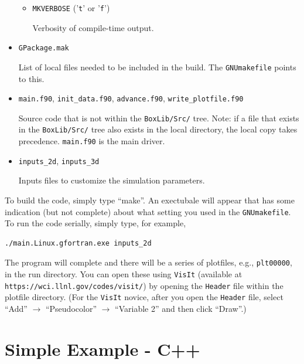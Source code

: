 \begin{itemize}
\begin{itemize}
    \item {\tt MKVERBOSE} ('{\tt t}' or '{\tt f}')

    Verbosity of compile-time output.

  \end{itemize}

\item {\tt GPackage.mak}

List of local files needed to be included in the build.  The {\tt GNUmakefile} points to this.

\item {\tt main.f90}, {\tt init\_data.f90}, {\tt advance.f90}, {\tt write\_plotfile.f90}

Source code that is not within the {\tt BoxLib/Src/} tree.  Note: if a file that exists in the
{\tt BoxLib/Src/} tree also exists in the local directory, the local copy takes precedence.
{\tt main.f90} is the main driver.

\item {\tt inputs\_2d}, {\tt inputs\_3d}

Inputs files to customize the simulation parameters.

\end{itemize}

To build the code, simply type ``make''.  An exectubale will appear that has some indication (but not complete)
about what setting you used in the {\tt GNUmakefile}.  To run the code serially, simply type, for example,
\begin{lstlisting}[language={[gnu]make},mathescape=false]
./main.Linux.gfortran.exe inputs_2d
\end{lstlisting}
The program will complete and there will be a series of plotfiles, e.g., {\tt plt00000}, in the run directory.
You can open these using {\tt VisIt} (available at {\tt https://wci.llnl.gov/codes/visit/}) by opening
the {\tt Header} file within the plotfile directory.  (For the {\tt VisIt} novice, after you open the {\tt Header}
file, select ``Add'' $\rightarrow$ ``Pseudocolor'' $\rightarrow$ ``Variable 2'' and then click ``Draw''.)

\section{Simple Example - C++}

